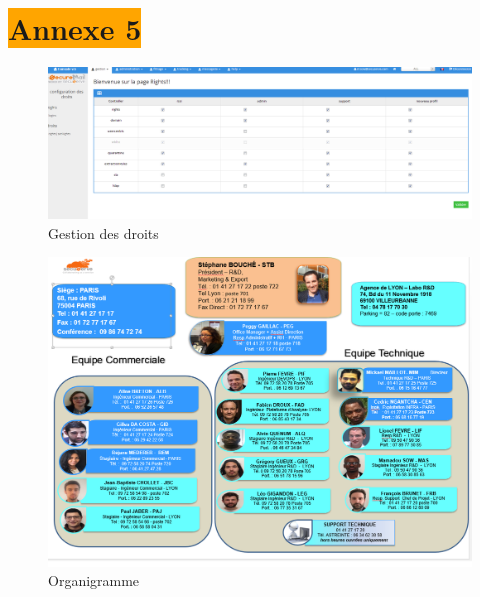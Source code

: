 \section{\colorbox{orange}{Annexe 5}}
\label{organigramme}
\begin{figure}[!h]
\begin{center}
\includegraphics[width=15cm]{image/page-rights.png}
\end{center}
\caption{Gestion des droits}
\end{figure}


\begin{figure}[!h]
\begin{center}
\includegraphics[width=15cm]{image/organi.png}
\end{center}
\caption{Organigramme}
\end{figure}